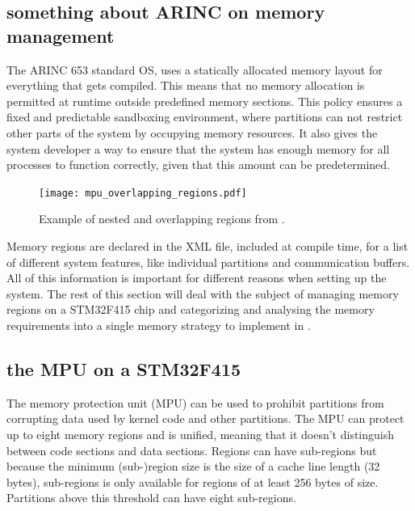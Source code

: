 \subsection{something about ARINC on memory management}
The ARINC 653 standard OS, uses a statically allocated memory layout for everything that gets compiled.
This means that no memory allocation is permitted at runtime
outside predefined memory sections.
This policy ensures a fixed and predictable sandboxing environment, where partitions can not restrict other parts of the system by occupying memory resources.
It also gives the system developer a way to ensure that the system has enough memory for all processes to function correctly, given that this amount can be predetermined.

\begin{figure}
	\vspace{-20pt}
	\centering
	\texttt{[image: mpu\_overlapping\_regions.pdf]}
	\caption{Example of nested and overlapping regions from \cite{stm32_mpu}.}
	\label{fig:stm32_mpu}
	\vspace{-40pt}
\end{figure}

Memory regions are declared in the XML file, included at compile time, for a list of different system features, like individual partitions and communication buffers.
All of this information is important for different reasons when setting up the system.
The rest of this section will deal with the subject of managing memory regions on a STM32F415 chip and categorizing and analysing the memory requirements into a single memory strategy to implement in .

\subsection{the MPU on a STM32F415}
The memory protection unit (MPU) can be used to prohibit partitions from corrupting data used by kernel code and other partitions.
The MPU can protect up to eight memory regions and is unified, meaning that it doesn't distinguish between code sections and data sections.
Regions can have sub-regions but because the minimum (sub-)region size is the size of a cache line length (32 bytes), sub-regions is only available for regions of at least 256 bytes of size.
Partitions above this threshold can have eight sub-regions.\\


